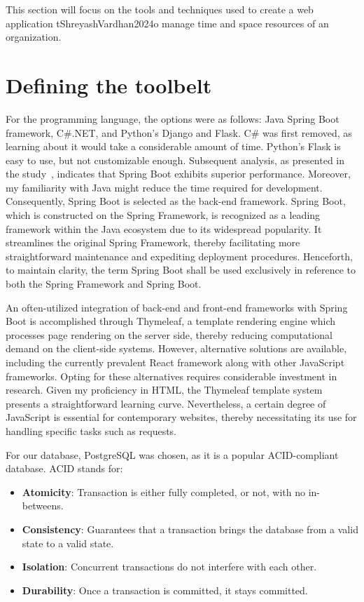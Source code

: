 This section will focus on the tools and techniques used to create a web application tShreyashVardhan2024o manage time and space resources of an organization.


\section{Defining the toolbelt}\label{sec:defining-the-toolbelt}

For the programming language, the options were as follows: Java Spring Boot framework, C\#.NET, and Python's Django and Flask.
C\# was first removed, as learning about it would take a considerable amount of time.
Python's Flask is easy to use, but not customizable enough.
Subsequent analysis, as presented in the study~\cite{ShreyashVardhan2024}, indicates that Spring Boot exhibits superior performance.
Moreover, my familiarity with Java might reduce the time required for development.
Consequently, Spring Boot is selected as the back-end framework.
Spring Boot, which is constructed on the Spring Framework, is recognized as a leading framework within the Java ecosystem due to its widespread popularity.
It streamlines the original Spring Framework, thereby facilitating more straightforward maintenance and expediting deployment procedures.
Henceforth, to maintain clarity, the term Spring Boot shall be used exclusively in reference to both the Spring Framework and Spring Boot.

An often-utilized integration of back-end and front-end frameworks with Spring Boot is accomplished through Thymeleaf, a template rendering engine which processes page rendering on the server side, thereby reducing computational demand on the client-side systems.
However, alternative solutions are available, including the currently prevalent React framework along with other JavaScript frameworks.
Opting for these alternatives requires considerable investment in research.
Given my proficiency in HTML, the Thymeleaf template system presents a straightforward learning curve.
Nevertheless, a certain degree of JavaScript is essential for contemporary websites, thereby necessitating its use for handling specific tasks such as requests.


For our database, PostgreSQL was chosen, as it is a popular ACID-compliant database.
ACID stands for:
\begin{itemize}
    \item \textbf{Atomicity}: Transaction is either fully completed, or not, with no in-betweens.
    \item \textbf{Consistency}: Guarantees that a transaction brings the database from a valid state to a valid state.
    \item \textbf{Isolation}: Concurrent transactions do not interfere with each other.
    \item \textbf{Durability}: Once a transaction is committed, it stays committed.
\end{itemize}


